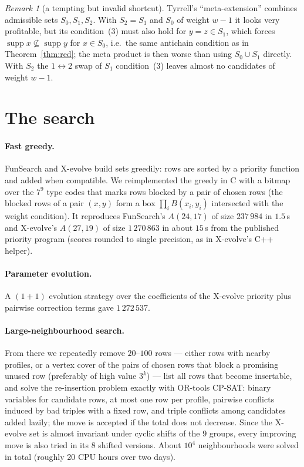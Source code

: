 \documentclass[11pt]{article}
\numberwithin{equation}{section}
\theoremstyle{definition}
\theoremstyle{remark}
\newtheorem{remark}[theorem]{Remark}
\begin{document}
\begin{remark}[a tempting but invalid shortcut]
Tyrrell's ``meta-extension'' \cite[\S3]{Tyrrell} combines admissible sets $S_0,S_1,S_2$.  With
$S_2=S_1$ and $S_0$ of weight $w-1$ it looks very profitable, but its condition~(3) must also hold for
$y=z\in S_1$, which forces $\operatorname{supp}x\not\subseteq\operatorname{supp}y$ for $x\in S_0$, i.e.\
the same antichain condition as in Theorem~\ref{thm:red}; the meta product is then worse than using
$S_0\cup S_1$ directly.  With $S_2$ the $1\leftrightarrow2$ swap of $S_1$ condition~(3) leaves almost
no candidates of weight $w-1$.
\end{remark}

\section{The search}
\paragraph{Fast greedy.}  FunSearch and X-evolve build sets greedily: rows are sorted by a priority
function and added when compatible.  We reimplemented the greedy in C with a bitmap over the $7^9$ type
codes that marks rows blocked by a pair of chosen rows (the blocked rows of a pair $(x,y)$ form a box
$\prod_i B(x_i,y_i)$ intersected with the weight condition).  It reproduces FunSearch's $A(24,17)$ of size
$237\,984$ in $1.5$\,s and X-evolve's $A(27,19)$ of size $1\,270\,863$ in about $15$\,s from the
published priority program (scores rounded to single precision, as in X-evolve's C++ helper).
\paragraph{Parameter evolution.}  A $(1+1)$ evolution strategy over the coefficients of the X-evolve
priority plus pairwise correction terms gave $1\,272\,537$.
\paragraph{Large-neighbourhood search.}  From there we repeatedly remove $20$--$100$ rows --- either
rows with nearby profiles, or a vertex cover of the pairs of chosen rows that block a promising unused
row (preferably of high value $3^k$) --- list all rows that become insertable, and solve the
re-insertion problem exactly with OR-tools CP-SAT: binary variables for candidate rows, at most one row
per profile, pairwise conflicts induced by bad triples with a fixed row, and triple conflicts among
candidates added lazily; the move is accepted if the total does not decrease.  Since the X-evolve set is almost invariant under cyclic shifts of the $9$ groups, every improving move is also tried in its $8$ shifted versions.  About $10^4$ neighbourhoods were solved in total (roughly 20 CPU hours over two days).
\end{document}
